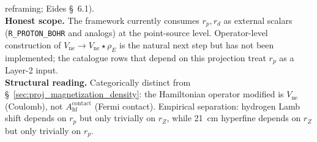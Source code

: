 \documentclass[11pt]{article}
\begin{document}
reframing; Eides \S~6.1).\\
\textbf{Honest scope.}  The framework currently consumes $r_p, r_d$
as external scalars (\texttt{R\_PROTON\_BOHR} and analogs) at the
point-source level.  Operator-level construction of $V_\text{ne}
\to V_\text{ne} \star \rho_E$ is the natural next step but has not
been implemented; the catalogue rows that depend on this projection
treat $r_p$ as a Layer-2 input.\\
\textbf{Structural reading.}  Categorically distinct from
\S~\ref{sec:proj_magnetization_density}: the Hamiltonian operator
modified is $V_\text{ne}$ (Coulomb), not $A_\text{hf}^\text{contact}$
(Fermi contact).  Empirical separation: hydrogen Lamb shift depends
on $r_p$ but only trivially on $r_Z$, while 21~cm hyperfine depends
on $r_Z$ but only trivially on $r_p$.
\end{document}
